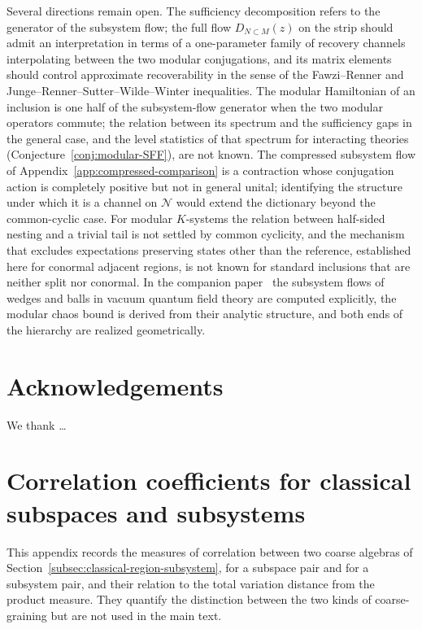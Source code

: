 \documentclass[a4paper,11pt]{article}
\theoremstyle{definition}
\begin{document}
Several directions remain open. The sufficiency decomposition refers to the generator of the subsystem flow; the full flow $D_{N\subset M}(z)$ on the strip should admit an interpretation in terms of a one-parameter family of recovery channels interpolating between the two modular conjugations, and its matrix elements should control approximate recoverability in the sense of the Fawzi--Renner and Junge--Renner--Sutter--Wilde--Winter inequalities. The modular Hamiltonian of an inclusion is one half of the subsystem-flow generator when the two modular operators commute; the relation between its spectrum and the sufficiency gaps in the general case, and the level statistics of that spectrum for interacting theories (Conjecture~\ref{conj:modular-SFF}), are not known. The compressed subsystem flow of Appendix~\ref{app:compressed-comparison} is a contraction whose conjugation action is completely positive but not in general unital; identifying the structure under which it is a channel on $\mathcal N$ would extend the dictionary beyond the common-cyclic case. For modular $K$-systems the relation between half-sided nesting and a trivial tail is not settled by common cyclicity, and the mechanism that excludes expectations preserving states other than the reference, established here for conormal adjacent regions, is not known for standard inclusions that are neither split nor conormal. In the companion paper~\cite{companionQFT} the subsystem flows of wedges and balls in vacuum quantum field theory are computed explicitly, the modular chaos bound is derived from their analytic structure, and both ends of the hierarchy are realized geometrically.

\section*{Acknowledgements}
We thank \ldots

\appendix

\section{Correlation coefficients for classical subspaces and subsystems}\label{app:classical-correlations}

This appendix records the measures of correlation between two coarse algebras of Section~\ref{subsec:classical-region-subsystem}, for a subspace pair and for a subsystem pair, and their relation to the total variation distance from the product measure. They quantify the distinction between the two kinds of coarse-graining but are not used in the main text.
\end{document}
